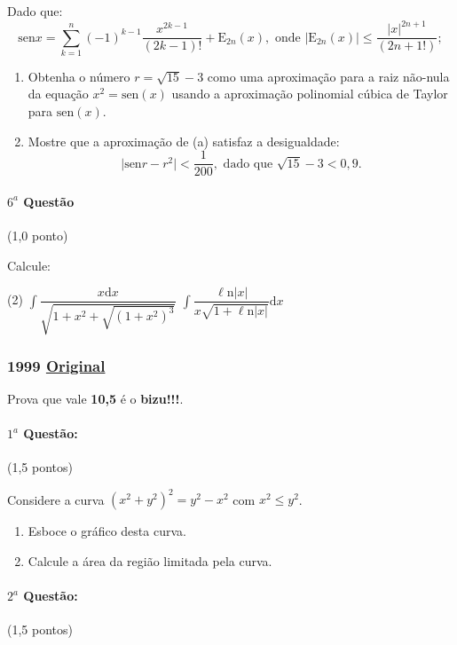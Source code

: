 \documentclass[12pt,a4paper]{article}
\newcommand{\dd}{\mathrm{d}}
\newcommand{\Ln}{\ell\mathrm{n}}
\newcommand{\intin}{\displaystyle\int}
\newcommand{\original}[1]{\tiny \href{#1}{Original} \normalsize}
\begin{document}
Dado que:
$$ \textrm{sen}x=\sum_{k=1}^n (-1)^{k-1} \dfrac{x^{2k-1}}{(2k-1)!} + \textrm{E}_{2n}(x),\textrm{ onde } \vert \textrm{E}_{2n}(x) \vert \leq \dfrac{\vert x \vert ^{2n+1}}{(2n+1!)};$$

\begin{enumerate}[label=(\alph*)]
\item Obtenha o número $r=\sqrt{15}-3$ como uma aproximação para a raiz não-nula da equação $x^2=\textrm{sen}(x)$ usando a aproximação polinomial
cúbica de Taylor para $\textrm{sen}(x)$.
\item Mostre que a aproximação de (a) satisfaz a desigualdade:
$$ \vert \textrm{sen}r-r^2 \vert < \dfrac{1}{200},\textrm{ dado que } \sqrt{15}-3<0,9.$$
\end{enumerate}

\paragraph{$6^a$ Questão} (1,0 ponto)

Calcule:

\begin{tasks}(2)
\task $\intin \dfrac{x\textrm{d}x}{\sqrt{1+x^2+\sqrt{(1+x^2)^3}}}$
\task  $\intin \dfrac{\Ln{\vert x \vert}}{x\sqrt{1+\Ln{\vert x \vert}}} \dd x$
\end{tasks}

\newpage

\subsubsection{1999 \original{https://drive.google.com/open?id=1c-X_Pb0kJu0iDxKeTBe8SgbmrPBg6ubY}}

\noindent Prova que vale \textbf{10,5} é o \textbf{bizu!!!}.

\paragraph{$1^a$ Questão:} (1,5 pontos) 

Considere a curva $(x^2+y^2)^2=y^2-x^2$ com $x^2 \leq y^2$.

\begin{enumerate}[label=(\alph*)]
\item Esboce o gráfico desta curva.
\item Calcule a área da região limitada pela curva.
\end{enumerate}

\paragraph{$2^a$ Questão:} (1,5 pontos)
\end{document}
